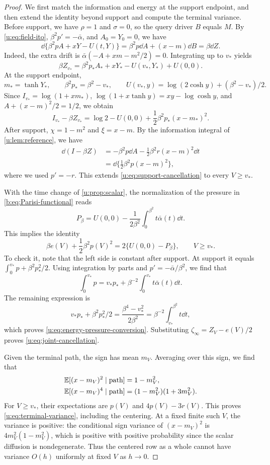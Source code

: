\begin{proof}
We first match the information and energy at the support endpoint, and then extend the identity beyond support and compute the terminal variance. Before support, we have $\rho=1$ and $\sigma=0$, so the query driver $B$ equals $M$. By \eqref{u:eq:field-ito}, $\beta^2p'=-\bar\alpha$, and $A_0=Y_0=0$, we have
\[
 \dd\{\beta^2pA+xY-U(t,Y)\}
 =\beta^2p\dd A+(x-m)\dd B=\beta\dd Z.
\]
Indeed, the extra drift is $\bar\alpha(-A+xm-m^2/2)=0$. Integrating up to $v_*$ yields
\[
 \beta Z_{v_*}=\beta^2p_*A_*+xY_*-U(v_*,Y_*)+U(0,0).
\]
At the support endpoint,
\[
 m_*=\tanh Y_*,\qquad \beta^2p_*=\beta^2-v_*,\qquad
 U(v_*,y)=\log(2\cosh y)+(\beta^2-v_*)/2.
\]
Since $I_{v_*}=\log(1+xm_*)$, $\log(1+x\tanh y)=xy-\log\cosh y$, and $A+(x-m)^2/2=1/2$, we obtain
\begin{equation}\label{u:eq:support-cancellation}
 I_{v_*}-\beta Z_{v_*}
 =\log2-U(0,0)+\frac12\beta^2p_*(x-m_*)^2.
\end{equation}
After support, $\chi=1-m^2$ and $\xi=x-m$. By the information integral of \cref{u:lem:reference}, we have
\[
\begin{aligned}
 \dd(I-\beta Z)
 &=-\beta^2p\dd A-\frac12\beta^2r(x-m)^2\dd t\\
 &=\dd\bigl\{\tfrac12\beta^2p(x-m)^2\bigr\},
\end{aligned}
\]
where we used $p'=-r$. This extends \eqref{u:eq:support-cancellation} to every $V\ge v_*$.

With the time change of \cref{u:prop:scalar}, the normalization of the pressure in \eqref{b:eq:Parisi-functional} reads
\[
 P_\beta=U(0,0)-\frac1{2\beta^2}
                  \int_0^{\beta^2}t\bar\alpha(t)\dd t.
\]
This implies the identity
\begin{equation}\label{u:eq:energy-pressure-conversion}
 \beta e(V)+\frac12\beta^2p(V)^2
 =2\{U(0,0)-P_\beta\},\qquad V\ge v_*.
\end{equation}
To check it, note that the left side is constant after support. At support it equals $\int_0^{v_*}p+\beta^2p_*^2/2$. Using integration by parts and $p'=-\bar\alpha/\beta^2$, we find that
\[
 \int_0^{v_*}p=v_*p_*+\beta^{-2}\int_0^{v_*}t\bar\alpha(t)\dd t.
\]
The remaining expression is
\[
 v_*p_*+\beta^2p_*^2/2
 =\frac{\beta^4-v_*^2}{2\beta^2}
 =\beta^{-2}\int_{v_*}^{\beta^2}t\dd t,
\]
which proves \eqref{u:eq:energy-pressure-conversion}. Substituting $\zeta_\infty=Z_V-e(V)/2$ proves \eqref{u:eq:joint-cancellation}.

Given the terminal path, the sign has mean $m_V$. Averaging over this sign, we find that
\[
\begin{aligned}
 \mathbb E[(x-m_V)^2\mid\text{path}]&=1-m_V^2,\\
 \mathbb E[(x-m_V)^4\mid\text{path}]&=(1-m_V^2)(1+3m_V^2).
\end{aligned}
\]
For $V\ge v_*$, their expectations are $p(V)$ and $4p(V)-3r(V)$. This proves \eqref{u:eq:terminal-variance}, including the centering. At a fixed finite such $V$, the variance is positive: the conditional sign variance of $(x-m_V)^2$ is $4m_V^2(1-m_V^2)$, which is positive with positive probability since the scalar diffusion is nondegenerate. Thus the centered row as a whole cannot have variance $O(h)$ uniformly at fixed $V$ as $h\to0$.


\end{proof}
